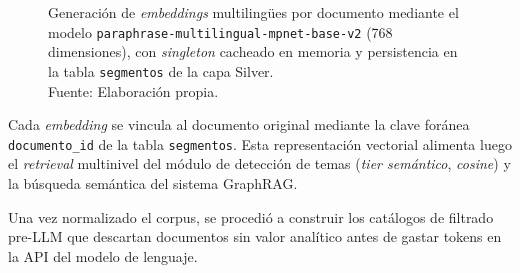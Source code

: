 \documentclass[listof=nochaptergap,12pt,times,authoryear]{report}
\begin{document}
\begin{figure}[!ht]
    \begin{center}

        \caption[Generación de embeddings multilingües con sentence-transformers]{Generación de \textit{embeddings} multilingües por documento mediante el modelo \texttt{paraphrase-multilingual-mpnet-base-v2} (768 dimensiones), con \textit{singleton} cacheado en memoria y persistencia en la tabla \texttt{segmentos} de la capa Silver.\\
            Fuente: Elaboración propia.}
        \label{5:fig14}
    \end{center}
\end{figure}

Cada \textit{embedding} se vincula al documento original mediante la clave
foránea \texttt{documento\_id} de la tabla \texttt{segmentos}. Esta representación
vectorial alimenta luego el \textit{retrieval} multinivel del módulo de detección
de temas (\textit{tier semántico}, \textit{cosine}) y la búsqueda semántica del
sistema GraphRAG.

Una vez normalizado el corpus, se procedió a construir los catálogos de filtrado
pre-LLM que descartan documentos sin valor analítico antes de gastar tokens en la
API del modelo de lenguaje.
\end{document}
